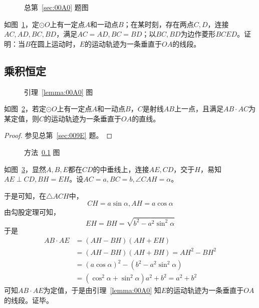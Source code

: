 

\begin{figure}[htbp]
  \centering
  \caption{总第~\ref{sec:00A0} 题图} \label{fig:00A0}
\end{figure}

如图~\ref{fig:00A0}，定$\odot O$上有一定点$A$和一动点$B$；在某时刻，存在两点$C, D$，连接$AC, AD, BC, BD$，满足$AC = AD, BC = BD$；以$BC, BD$为边作菱形$BCED$。证明：当$B$在圆上运动时，$E$的运动轨迹为一条垂直于$OA$的线段。

\subsection{乘积恒定} \label{subsec:00A0-mul}

\begin{lemma} \label{lemma:00A0}
  \begin{figure}[htbp]
    \centering
    \caption{引理~\ref{lemma:00A0} 图} \label{fig:00A0-lemma}
  \end{figure}

  如图~\ref{fig:00A0-lemma}，若定$\odot O$上有一定点$A$和一动点$B$，$C$是射线$AB$上一点，且满足$AB \cdot AC$为某定值，则$C$的运动轨迹为一条垂直于$OA$的直线。
\end{lemma}

\begin{proof}
  参见总第~\ref{sec:009E} 题。
\end{proof}

\begin{figure}[htbp]
  \centering
  \caption{方法~\ref{subsec:00A0-mul} 图} \label{fig:00A0-mul}
\end{figure}

如图~\ref{fig:00A0-mul}，显然$A, B, E$都在$CD$的中垂线上，连接$AE, CD$，交于$H$，易知$AE \perp CD, BH = EH$。设$AC = a, BC = b, \angle CAH = \alpha$。

于是可知，在$\triangle ACH$中，
\[ CH = a\sin\alpha, AH = a\cos\alpha \]
由勾股定理可知，
\[ EH = BH = \sqrt{b^2 - a^2\sin^2\alpha} \]
于是
\begin{align*}
  AB \cdot AE &= (AH - BH)(AH + EH) \\
  &= (AH - BH)(AH + BH) = AH^2 - BH^2 \\
  &= (a\cos\alpha)^2 - \left(b^2 - a^2\sin^2\alpha\right) \\
  &= \left(\cos^2\alpha + \sin^2\alpha\right)a^2 + b^2 = a^2 + b^2
\end{align*}
可知$AB \cdot AE$为定值，于是由引理~\ref{lemma:00A0} 知$E$的运动轨迹为一条垂直于$OA$的线段。证毕。
